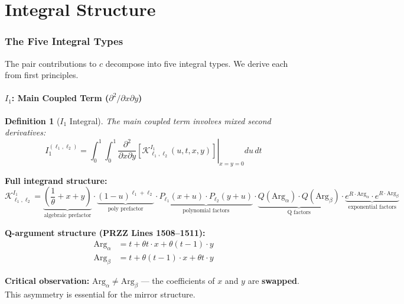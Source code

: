 \documentclass[11pt]{article}
\newtheorem{definition}{Definition}
\begin{document}
\part{Integral Structure}

\section{The Five Integral Types}
\label{sec:integrals}

The pair contributions to $c$ decompose into five integral types. We derive each from first principles.

\subsection{$I_1$: Main Coupled Term ($\partial^2/\partial x \partial y$)}

\begin{definition}[$I_1$ Integral]
The main coupled term involves mixed second derivatives:
\begin{equation}
\boxed{
I_1^{(\ell_1,\ell_2)} = \int_0^1 \int_0^1 \left.\frac{\partial^2}{\partial x \partial y}\left[\mathcal{K}^{I_1}_{\ell_1,\ell_2}(u,t,x,y)\right]\right|_{x=y=0} du\, dt
}
\end{equation}
\end{definition}

\textbf{Full integrand structure:}
\begin{equation}
\mathcal{K}^{I_1}_{\ell_1,\ell_2} = \underbrace{\left(\frac{1}{\theta} + x + y\right)}_{\text{algebraic prefactor}} \cdot \underbrace{(1-u)^{\ell_1+\ell_2}}_{\text{poly prefactor}} \cdot \underbrace{P_{\ell_1}(x+u) \cdot P_{\ell_2}(y+u)}_{\text{polynomial factors}} \cdot \underbrace{Q(\text{Arg}_\alpha) \cdot Q(\text{Arg}_\beta)}_{\text{Q factors}} \cdot \underbrace{e^{R \cdot \text{Arg}_\alpha} \cdot e^{R \cdot \text{Arg}_\beta}}_{\text{exponential factors}}
\end{equation}

\textbf{Q-argument structure (PRZZ Lines 1508--1511):}
\begin{align}
\text{Arg}_\alpha &= t + \theta t \cdot x + \theta(t-1) \cdot y \\
\text{Arg}_\beta &= t + \theta(t-1) \cdot x + \theta t \cdot y
\end{align}

\textbf{Critical observation:} $\text{Arg}_\alpha \neq \text{Arg}_\beta$ --- the coefficients of $x$ and $y$ are \textbf{swapped}. This asymmetry is essential for the mirror structure.
\end{document}
